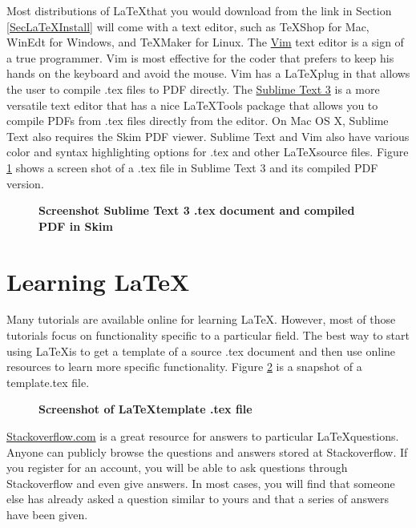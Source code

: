  Most distributions of \LaTeX that you would download from the link in Section \ref{SecLaTeXInstall} will come with a text editor, such as TeXShop for Mac, WinEdt for Windows, and TeXMaker for Linux. The \href{http://www.vim.org/}{Vim} text editor is a sign of a true programmer. Vim is most effective for the coder that prefers to keep his hands on the keyboard and avoid the mouse. Vim has a \LaTeX plug in that allows the user to compile .tex files to PDF directly. The \href{https://www.sublimetext.com/3}{Sublime Text 3} is a more versatile text editor that has a nice LaTeXTools package that allows you to compile PDFs from .tex files directly from the editor. On Mac OS X, Sublime Text also requires the Skim PDF viewer. Sublime Text and Vim also have various color and syntax highlighting options for .tex and other \LaTeX source files. Figure \ref{FigSubTxtSkimPDF} shows a screen shot of a .tex file in Sublime Text 3 and its compiled PDF version.

  \begin{figure}[htbp]\centering\captionsetup{width=6.0in}
    \caption{\textbf{Screenshot Sublime Text 3 .tex document and compiled PDF in Skim}}\label{FigSubTxtSkimPDF}
  \end{figure}


\section{Learning \LaTeX}\label{SecLaTeXLearning}

  Many tutorials are available online for learning \LaTeX. However, most of those tutorials focus on functionality specific to a particular field. The best way to start using \LaTeX is to get a template of a source .tex document and then use online resources to learn more specific functionality. Figure \ref{FigLaTeXtemplate} is a snapshot of a template.tex file.

  \begin{figure}[htbp]\centering\captionsetup{width=4.0in}
    \caption{\textbf{Screenshot of \LaTeX template .tex file}}\label{FigLaTeXtemplate}
  \end{figure}

  \href{http://stackoverflow.com/}{Stackoverflow.com} is a great resource for answers to particular \LaTeX questions. Anyone can publicly browse the questions and answers stored at Stackoverflow. If you register for an account, you will be able to ask questions through Stackoverflow and even give answers. In most cases, you will find that someone else has already asked a question similar to yours and that a series of answers have been given.


